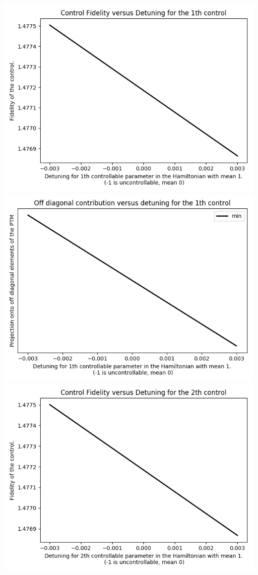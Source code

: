 \documentclass{article}
\begin{document}
\begin{center}
\includegraphics[scale=.9]{control_fid_2}
\includegraphics[scale=.9]{off_diag_2}
\includegraphics[scale=.9]{control_fid_3}

\end{center}
\end{document}
